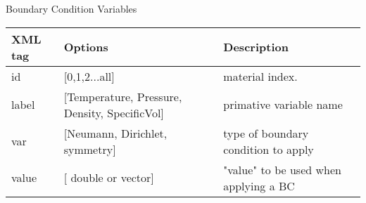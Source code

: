 \begin{center}
Boundary Condition Variables
\begin{tabular}{l p{7cm} p{7cm}}
\footnotesize{XML tag} & \footnotesize{Options}& \footnotesize{Description}\\
\hline
\hline
id          &  [0,1,2...all]                                   &   material index.\\
label       & [Temperature, Pressure, Density, SpecificVol]    &   primative variable name\\
var         & [Neumann, Dirichlet, symmetry]                   &   type of boundary condition to apply \\
value       & [ double or vector]                              &   "value" to be used when applying a BC\\
\hline
\end{tabular}
\end{center}
\normalsize
